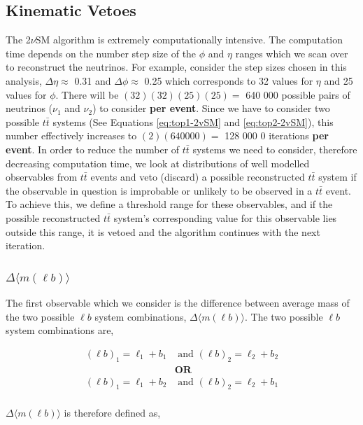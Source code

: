 \subsection{Kinematic Vetoes}
The 2$\nu$SM algorithm is extremely computationally intensive. The computation time depends on the number step size of the $\phi$ and $\eta$ ranges which we scan over to reconstruct the neutrinos. For example, consider the step sizes chosen in this analysis, $\Delta \eta \approx$ 0.31 and $\Delta \phi \approx$ 0.25 which corresponds to 32 values for $\eta$ and 25 values for $\phi$. There will be $(32)(32)(25)(25) = $ 640 000 possible pairs of neutrinos ($\nu_{1}$ and $\nu_{2}$) to consider \textbf{per event}. Since we have to consider two possible $t\bar{t}$ systems (See Equations \ref{eq:top1-2vSM} and \ref{eq:top2-2vSM}), this number effectively increases to $(2)(640000) = $ 128 000 0 iterations \textbf{per event}. In order to reduce the number of $t\bar{t}$ systems we need to consider, therefore decreasing computation time, we look at distributions of well modelled observables from $t\bar{t}$ events and veto (discard) a possible reconstructed $t\bar{t}$ system if the observable in question is improbable or unlikely to be observed in a $t\bar{t}$ event. To achieve this, we define a threshold range for these observables, and if the possible reconstructed $t\bar{t}$ system's corresponding value for this observable lies outside this range, it is vetoed and the algorithm continues with the next iteration.

\subsubsection{$\Delta \langle m(\ell b)\rangle$}

The first observable which we consider is the difference between average mass of the two possible $\ell b$ system combinations, $\Delta \langle m(\ell b)\rangle$. The two possible $\ell b$ system combinations are,

\begin{align}
    (\ell b)_{1} = \ell_{1} + b_{1} &\text{ and }  (\ell b)_{2}  = \ell_{2} + b_{2} \\
    &\textbf{OR}\nonumber\\ 
     (\ell b)_{1} = \ell_{1} + b_{2} &\text{ and }  (\ell b)_{2}  = \ell_{2} + b_{1} \\
\end{align}

$\Delta \langle m(\ell b) \rangle$ is therefore defined as,

